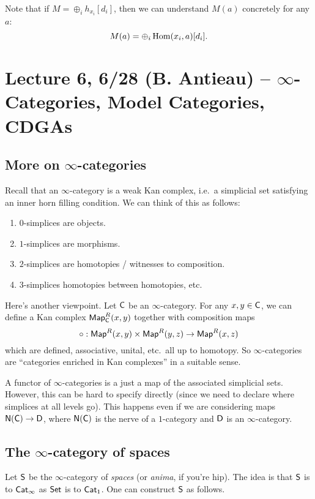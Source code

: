 \documentclass{amsart}
\begin{document}
Note that if $M = \oplus_i h_{x_i}[d_i]$, then we can understand $M(a)$ concretely for any $a$:
\[
M(a) = \oplus_i \operatorname{Hom}(x_i, a)[d_i].
\]

\section{Lecture 6, 6/28 (B. Antieau) -- $\infty$-Categories, Model Categories, CDGAs}

\subsection{More on $\infty$-categories}

Recall that an $\infty$-category is a weak Kan complex, i.e.\ a simplicial set satisfying an inner horn filling condition.
We can think of this as follows:
\begin{enumerate}
	\item $0$-simplices are objects.
	\item $1$-simplices are morphisms.
	\item $2$-simplices are homotopies / witnesses to composition.
	\item $3$-simplices homotopies between homotopies, etc.
\end{enumerate}

Here's another viewpoint.
Let $\mathsf{C}$ be an $\infty$-category.
For any $x, y \in \mathsf{C}$, we can define a Kan complex $\mathsf{Map}^R_{\mathsf{C}}(x, y)$ together with composition maps
\[
	\circ: \mathsf{Map}^R(x, y) \times \mathsf{Map}^R(y, z) \to \mathsf{Map}^R(x, z)
\]
which are defined, associative, unital, etc.\ all up to homotopy.
So $\infty$-categories are ``categories enriched in Kan complexes'' in a suitable sense.

A functor of $\infty$-categories is a just a map of the associated simplicial sets.
However, this can be hard to specify directly (since we need to declare where simplices at all levels go).
This happens even if we are considering maps $\mathsf{N}(\mathsf{C}) \to \mathsf{D}$, where $\mathsf{N}(\mathsf{C})$ is the nerve of a $1$-category and $\mathsf{D}$ is an $\infty$-category.

\subsection{The $\infty$-category of spaces}

Let $\mathsf{S}$ be the $\infty$-category of \emph{spaces} (or \emph{anima}, if you're hip).
The idea is that $\mathsf{S}$ is to $\mathsf{Cat}_\infty$ as $\mathsf{Set}$ is to $\mathsf{Cat}_1$.
One can construct $\mathsf{S}$ as follows.
\end{document}
